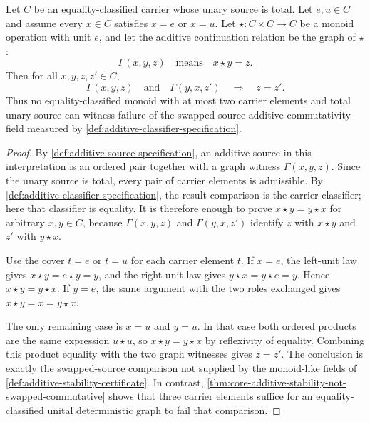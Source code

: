 \begin{theorem}
\label{thm:two-element-monoid-cannot-witness-additive-noncommutativity}
Let $C$ be an equality-classified carrier whose unary source is total. Let $e,u\in C$ and assume every $x\in C$ satisfies $x=e$ or $x=u$. Let $\star:C\times C\to C$ be a monoid operation with unit $e$, and let the additive continuation relation be the graph of $\star$:
$$
  \Gamma(x,y,z)\quad\text{means}\quad x\star y=z.
$$
Then for all $x,y,z,z'\in C$,
$$
  \Gamma(x,y,z)
  \quad\text{and}\quad
  \Gamma(y,x,z')
  \quad\Rightarrow\quad
  z=z'.
$$
Thus no equality-classified monoid with at most two carrier elements and total unary source can witness failure of the swapped-source additive commutativity field measured by \autoref{def:additive-classifier-specification}.
\end{theorem}
\begin{proof}
By \autoref{def:additive-source-specification}, an additive source in this interpretation is an ordered pair together with a graph witness $\Gamma(x,y,z)$. Since the unary source is total, every pair of carrier elements is admissible. By \autoref{def:additive-classifier-specification}, the result comparison is the carrier classifier; here that classifier is equality. It is therefore enough to prove $x\star y=y\star x$ for arbitrary $x,y\in C$, because $\Gamma(x,y,z)$ and $\Gamma(y,x,z')$ identify $z$ with $x\star y$ and $z'$ with $y\star x$.

Use the cover $t=e$ or $t=u$ for each carrier element $t$. If $x=e$, the left-unit law gives $x\star y=e\star y=y$, and the right-unit law gives $y\star x=y\star e=y$. Hence $x\star y=y\star x$. If $y=e$, the same argument with the two roles exchanged gives $x\star y=x=y\star x$.

The only remaining case is $x=u$ and $y=u$. In that case both ordered products are the same expression $u\star u$, so $x\star y=y\star x$ by reflexivity of equality. Combining this product equality with the two graph witnesses gives $z=z'$. The conclusion is exactly the swapped-source comparison not supplied by the monoid-like fields of \autoref{def:additive-stability-certificate}. In contrast, \autoref{thm:core-additive-stability-not-swapped-commutative} shows that three carrier elements suffice for an equality-classified unital deterministic graph to fail that comparison.
\end{proof}

